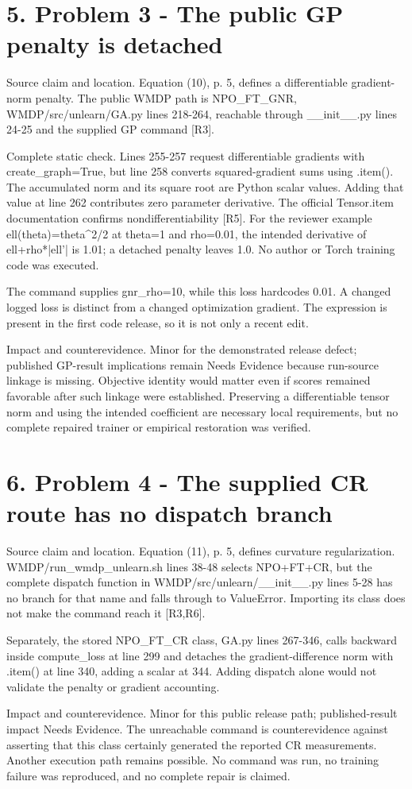 \documentclass[10pt]{article}
\begin{document}
\section*{5. Problem 3 - The public GP penalty is detached}
Source claim and location. Equation (10), p. 5, defines a differentiable gradient-norm penalty. The public WMDP path is NPO\_FT\_GNR, WMDP/src/unlearn/GA.py lines 218-264, reachable through \_\_init\_\_.py lines 24-25 and the supplied GP command [R3].\par
Complete static check. Lines 255-257 request differentiable gradients with create\_graph=True, but line 258 converts squared-gradient sums using .item(). The accumulated norm and its square root are Python scalar values. Adding that value at line 262 contributes zero parameter derivative. The official Tensor.item documentation confirms nondifferentiability [R5]. For the reviewer example ell(theta)=theta\textasciicircum{}2/2 at theta=1 and rho=0.01, the intended derivative of ell+rho*|ell’| is 1.01; a detached penalty leaves 1.0. No author or Torch training code was executed.\par
The command supplies gnr\_rho=10, while this loss hardcodes 0.01. A changed logged loss is distinct from a changed optimization gradient. The expression is present in the first code release, so it is not only a recent edit.\par
Impact and counterevidence. Minor for the demonstrated release defect; published GP-result implications remain Needs Evidence because run-source linkage is missing. Objective identity would matter even if scores remained favorable after such linkage were established. Preserving a differentiable tensor norm and using the intended coefficient are necessary local requirements, but no complete repaired trainer or empirical restoration was verified.\par
\section*{6. Problem 4 - The supplied CR route has no dispatch branch}
Source claim and location. Equation (11), p. 5, defines curvature regularization. WMDP/run\_wmdp\_unlearn.sh lines 38-48 selects NPO+FT+CR, but the complete dispatch function in WMDP/src/unlearn/\_\_init\_\_.py lines 5-28 has no branch for that name and falls through to ValueError. Importing its class does not make the command reach it [R3,R6].\par
Separately, the stored NPO\_FT\_CR class, GA.py lines 267-346, calls backward inside compute\_loss at line 299 and detaches the gradient-difference norm with .item() at line 340, adding a scalar at 344. Adding dispatch alone would not validate the penalty or gradient accounting.\par
Impact and counterevidence. Minor for this public release path; published-result impact Needs Evidence. The unreachable command is counterevidence against asserting that this class certainly generated the reported CR measurements. Another execution path remains possible. No command was run, no training failure was reproduced, and no complete repair is claimed.\par
\end{document}
